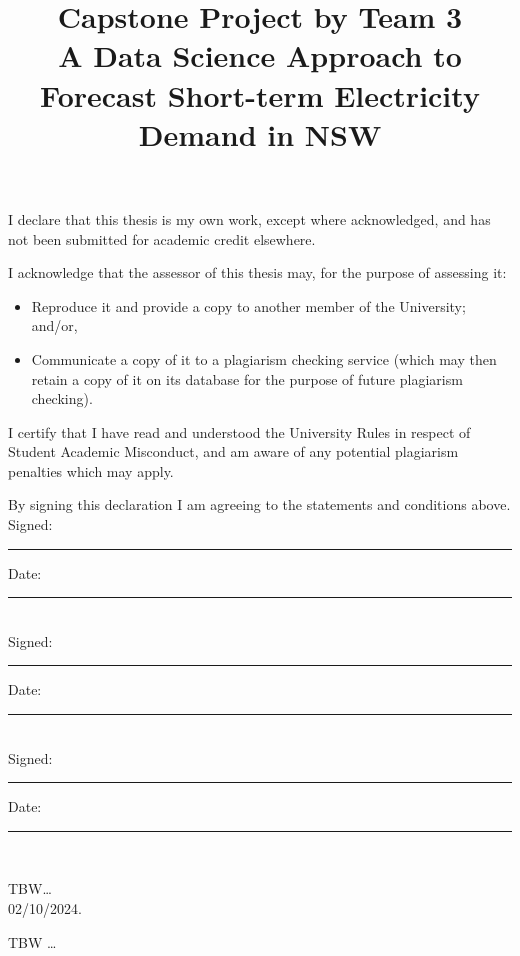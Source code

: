 \documentclass[mstat,12pt]{unswthesis}
\title{Capstone Project by Team 3\\[0.5cm]A Data Science Approach to
Forecast Short-term Electricity Demand in NSW}
\author{\Authornameonly}
\begin{document}
\beforepreface




\vskip 2pc \noindent I declare that this thesis is my
own work, except where acknowledged, and has not been submitted for
academic credit elsewhere. 

\vskip 2pc  \noindent I acknowledge that the assessor of this
thesis may, for the purpose of assessing it:
\begin{itemize}
\item Reproduce it and provide a copy to another member of the University; and/or,
\item Communicate a copy of it to a plagiarism checking service (which may then retain a copy of it on its database for the purpose of future plagiarism checking).
\end{itemize}

\vskip 2pc \noindent I certify that I have read and understood the University Rules in
respect of Student Academic Misconduct, and am aware of any potential plagiarism penalties which may 
apply.\vspace{24pt}

\vskip 2pc \noindent By signing 
this declaration I am
agreeing to the statements and conditions above.
\vskip 2pc \noindent
Signed: \rule{7cm}{0.25pt} \hfill Date: \rule{4cm}{0.25pt} \\[1cm]
Signed: \rule{7cm}{0.25pt} \hfill Date: \rule{4cm}{0.25pt} \\[1cm]
Signed: \rule{7cm}{0.25pt} \hfill Date: \rule{4cm}{0.25pt} \\[1cm]
\vskip 1pc





{\bigskip}TBW\ldots{}\\[1cm] 

{\bigskip\bigskip\bigskip\noindent} 02/10/2024.




TBW \ldots{}



\afterpreface
\end{document}
